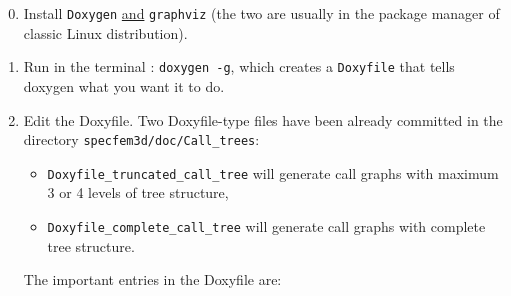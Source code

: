 \begin{enumerate}
\setcounter{enumi}{-1}
\item Install \texttt{Doxygen} \underline{and} \texttt{graphviz} (the two are usually in the package manager of classic Linux distribution).
\item Run in the terminal : \texttt{doxygen -g}, which creates a \texttt{Doxyfile} that tells doxygen what you want it to do.
\item Edit the Doxyfile. Two Doxyfile-type files have been already committed in the directory \newline
\noindent \texttt{specfem3d/doc/Call\_trees}:

\begin{itemize}
\item[\textbullet] \texttt{Doxyfile\_truncated\_call\_tree} will generate call graphs with maximum 3 or 4 levels of tree structure,
\item[\textbullet] \texttt{Doxyfile\_complete\_call\_tree} will generate call graphs with complete tree structure.
\end{itemize}

The important entries in the Doxyfile are:


\end{enumerate}
